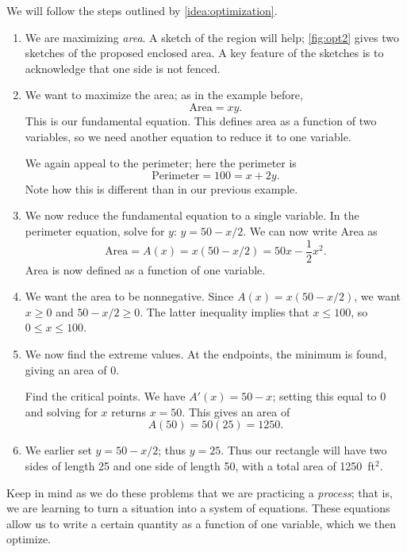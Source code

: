 {We will follow the steps outlined by \autoref{idea:optimization}. 
\begin{enumerate}
	\item		We are maximizing \textit{area}. A sketch of the region will help; \autoref{fig:opt2} gives two sketches of the proposed enclosed area. A key feature of the sketches is to acknowledge that one side is not fenced. 
	
	\item		We want to maximize the area; as in the example before,
	\[\text{Area} = xy.\]
	This is our fundamental equation. This defines area as a function of two variables, so we need another equation to  reduce it to one variable.
	
	We again appeal to the perimeter; here the perimeter is
	\[\text{Perimeter} = 100 = x+2y.\]
	Note how this is different than in our previous example.
	\item		We now reduce the fundamental equation to a single variable. In the perimeter equation, solve for $y$: $y = 50 - x/2$. We can now write Area as
	\[\text{Area} = A(x) = x(50-x/2) = 50x - \frac12x^2.\]
	Area is now defined as a function of one variable.
	\item		We want the area to be nonnegative. Since $A(x) = x(50-x/2)$, we want $x\geq 0$ and $50-x/2\geq 0$. The latter inequality implies that $x\leq100$, so $0\leq x\leq 100$. 
	\item		We now find the extreme values. At the endpoints, the minimum is found, giving an area of 0. 
	
	Find the critical points. We have $A'(x) = 50-x$; setting this equal to 0 and solving for $x$ returns $x=50$. This gives an area of
	\[A(50) = 50(25) = 1250.\]
	\item		We earlier set $y = 50-x/2$; thus $y = 25$. Thus our rectangle will have two sides of length 25 and one side of length 50, with a total area of 1250~ft$^2$.\eoehere
\end{enumerate}}

Keep in mind as we do these problems that we are practicing a \textit{process}; that is, we are learning to turn a situation into a system of equations. These equations allow us to write a certain quantity as a function of one variable, which we then optimize.

